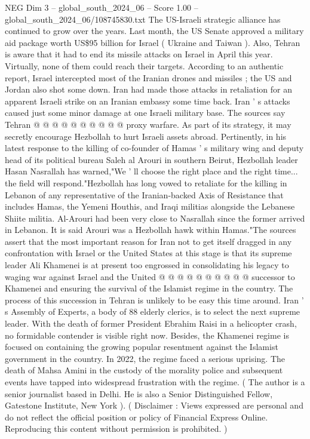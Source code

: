 \begin{textsample}{NEG Dim 3 – global\_south\_2024\_06 – Score 1.00 – global\_south\_2024\_06/108745830.txt}
The US-Israeli strategic alliance has continued to grow over the years.
Last month, the US Senate approved a military aid package worth US\$95 billion for Israel ( Ukraine and Taiwan ).
Also, Tehran is aware that it had to end its missile attacks on Israel in April this year.
Virtually, none of them could reach their targets.
According to an authentic report, Israel intercepted most of the Iranian drones and missiles ; the US and Jordan also shot some down.
Iran had made those attacks in retaliation for an apparent Israeli strike on an Iranian embassy some time back.
Iran ' s attacks caused just some minor damage at one Israeli military base.
The sources say Tehran @ @ @ @ @ @ @ @ @ @ proxy warfare.
As part of its strategy, it may secretly encourage Hezbollah to hurt Israeli assets abroad.
Pertinently, in his latest response to the killing of co-founder of Hamas ' s military wing and deputy head of its political bureau Saleh al Arouri in southern Beirut, Hezbollah leader Hasan Nasrallah has warned,"We ' ll choose the right place and the right time... the field will respond."Hezbollah has long vowed to retaliate for the killing in Lebanon of any representative of the Iranian-backed Axis of Resistance that includes Hamas, the Yemeni Houthis, and Iraqi militias alongside the Lebanese Shiite militia.
Al-Arouri had been very close to Nasrallah since the former arrived in Lebanon.
It is said Arouri was a Hezbollah hawk within Hamas."The sources assert that the most important reason for Iran not to get itself dragged in any confrontation with Israel or the United States at this stage is that its supreme leader Ali Khamenei is at present too engrossed in consolidating his legacy to waging war against Israel and the United @ @ @ @ @ @ @ @ @ @ successor to Khamenei and ensuring the survival of the Islamist regime in the country.
The process of this succession in Tehran is unlikely to be easy this time around.
Iran ' s Assembly of Experts, a body of 88 elderly clerics, is to select the next supreme leader.
With the death of former President Ebrahim Raisi in a helicopter crash, no formidable contender is visible right now.
Besides, the Khamenei regime is focused on containing the growing popular resentment against the Islamist government in the country.
In 2022, the regime faced a serious uprising.
The death of Mahsa Amini in the custody of the morality police and subsequent events have tapped into widespread frustration with the regime. ( The author is a senior journalist based in Delhi.
He is also a Senior Distinguished Fellow, Gatestone Institute, New York ). ( Disclaimer : Views expressed are personal and do not reflect the official position or policy of Financial Express Online.
Reproducing this content without permission is prohibited. )

\end{textsample}
